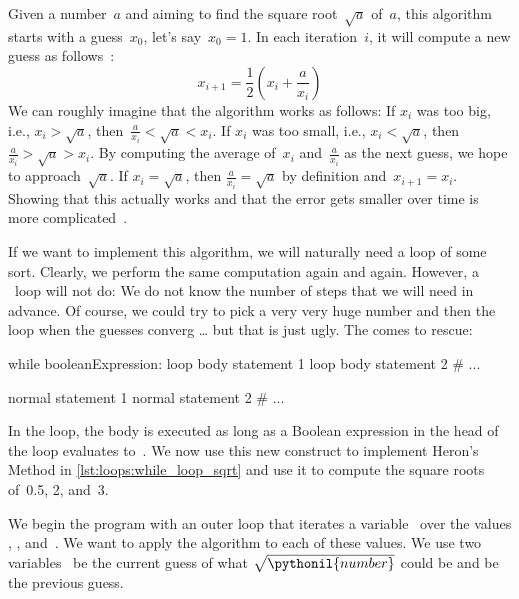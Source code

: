Given a number~$a$ and aiming to find the square root~$\sqrt{a}$ of~$a$, this algorithm starts with a guess~$x_0$, let's say~$x_0=1$.
In each iteration~$i$, it will compute a new guess as follows~\cite{S2011NA2,K2009BMOCTSRJBOFTAOCC}:%
%
\begin{equation}%
x_{i+1}=\frac{1}{2}\left(x_i+\frac{a}{x_i}\right)%
\label{eq:heronGuessUpdate}%
\end{equation}%
%
We can roughly imagine that the algorithm works as follows:
If $x_i$ was too big, i.e., $x_i>\sqrt{a}$, then~$\frac{a}{x_i}<\sqrt{a}<x_i$.
If $x_i$ was too small, i.e., $x_i<\sqrt{a}$, then $\frac{a}{x_i}>\sqrt{a}>x_i$.
By computing the average of~$x_i$ and~$\frac{a}{x_i}$ as the next guess, we hope to approach~$\sqrt{a}$.
If $x_i=\sqrt{a}$, then $\frac{a}{x_i}=\sqrt{a}$ by definition and~$x_{i+1}=x_i$.
Showing that this actually works and that the error gets smaller over time is more complicated~\cite{S2011NA2}.

If we want to implement this algorithm, we will naturally need a loop of some sort.
Clearly, we perform the same computation again and again.
However, a ~loop will not do:
We do not know the number of steps that we will need in advance.
Of course, we could try to pick a very very huge number and then  the loop when the guesses converg {\dots} but that is just ugly.
The  comes to rescue:%
%
\begin{pythonSyntax}
while booleanExpression:
    loop body statement 1
    loop body statement 2
    # ...

normal statement 1
normal statement 2
# ...
\end{pythonSyntax}
\FloatBarrier%
%
%
%
In the  loop, the body is executed as long as a Boolean expression in the head of the loop evaluates to~.
We now use this new construct to implement Heron's Method in \cref{lst:loops:while_loop_sqrt} and use it to compute the square roots of~0.5, 2, and~3.

We begin the program with an outer  loop that iterates a variable~ over the  values , , and~.
We want to apply the algorithm to each of these values.
We use two variables~ be the current guess of what $\sqrt{\pythonil{number}}$ could be and  be the previous guess.

